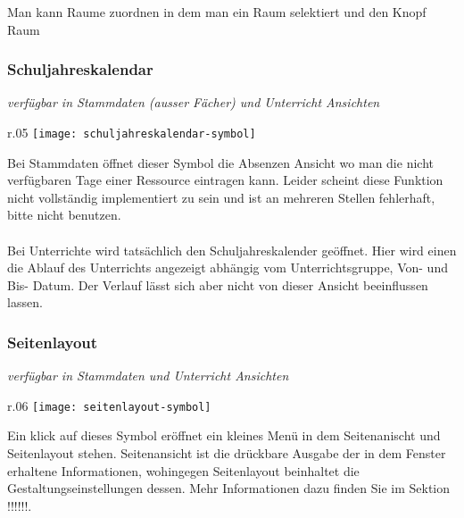 \noindent
Man kann Raume zuordnen in dem man ein Raum selektiert und den Knopf Raum 

\subsubsection{Schuljahreskalendar}
{\small\textit{verfügbar in Stammdaten (ausser Fächer) und Unterricht Ansichten\\}\par}

\begin{wrapfigure}{r}{.05\textwidth}
	\vspace{-50pt}
	\texttt{[image: schuljahreskalendar-symbol]}
	\vspace{-35pt}
\end{wrapfigure}

\noindent
Bei Stammdaten öffnet dieser Symbol die Absenzen Ansicht wo man die nicht verfügbaren Tage einer Ressource eintragen kann. Leider scheint diese Funktion nicht vollständig implementiert zu sein und ist an mehreren Stellen fehlerhaft, bitte nicht benutzen.\\
\\
Bei Unterrichte wird tatsächlich den Schuljahreskalender geöffnet. Hier wird einen die Ablauf des Unterrichts angezeigt abhängig vom Unterrichtsgruppe, Von- und Bis- Datum. Der Verlauf lässt sich aber nicht von dieser Ansicht beeinflussen lassen.\\

\subsubsection{Seitenlayout}
{\small\textit{verfügbar in Stammdaten und Unterricht Ansichten\\}\par}

\begin{wrapfigure}{r}{.06\textwidth}
	\vspace{-50pt}
	\texttt{[image: seitenlayout-symbol]}
	\vspace{-35pt}
\end{wrapfigure}

\noindent
Ein klick auf dieses Symbol eröffnet ein kleines Menü in dem Seitenanischt und Seitenlayout stehen. Seitenansicht ist die drückbare Ausgabe der in dem Fenster erhaltene Informationen, wohingegen Seitenlayout beinhaltet die Gestaltungseinstellungen dessen. Mehr Informationen dazu finden Sie im Sektion !!!!!!.\\

